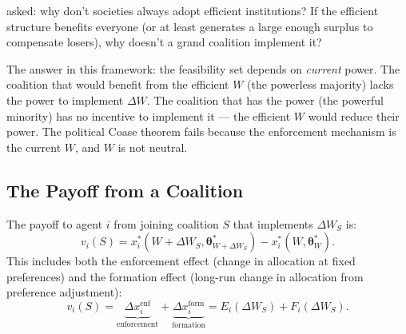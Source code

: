 \documentclass[../structural_economics_book.tex]{subfiles}
\begin{document}
\begin{intuition}
\citet{acemoglu2003why} asked: why don't societies always adopt efficient institutions? If the efficient structure benefits everyone (or at least generates a large enough surplus to compensate losers), why doesn't a grand coalition implement it?

The answer in this framework: the feasibility set depends on \textit{current} power. The coalition that would benefit from the efficient $W$ (the powerless majority) lacks the power to implement $\Delta W$. The coalition that has the power (the powerful minority) has no incentive to implement it --- the efficient $W$ would reduce their power. The political Coase theorem fails because the enforcement mechanism is the current $W$, and $W$ is not neutral.
\end{intuition}


\subsection{The Payoff from a Coalition}

\begin{definition}\label{ch14:def:payoff}
The payoff to agent $i$ from joining coalition $S$ that implements $\Delta W_S$ is:
\begin{equation}\label{ch14:eq:payoff}
v_i(S) = x_i^*(W + \Delta W_S, \boldsymbol{\theta}^*_{W + \Delta W_S}) - x_i^*(W, \boldsymbol{\theta}^*_W).
\end{equation}
This includes both the enforcement effect (change in allocation at fixed preferences) and the formation effect (long-run change in allocation from preference adjustment):
\begin{equation}\label{ch14:eq:payoff_decomp}
v_i(S) = \underbrace{\Delta x_i^{\text{enf}}}_{\text{enforcement}} + \underbrace{\Delta x_i^{\text{form}}}_{\text{formation}} = E_i(\Delta W_S) + F_i(\Delta W_S).
\end{equation}
\end{definition}
\end{document}
